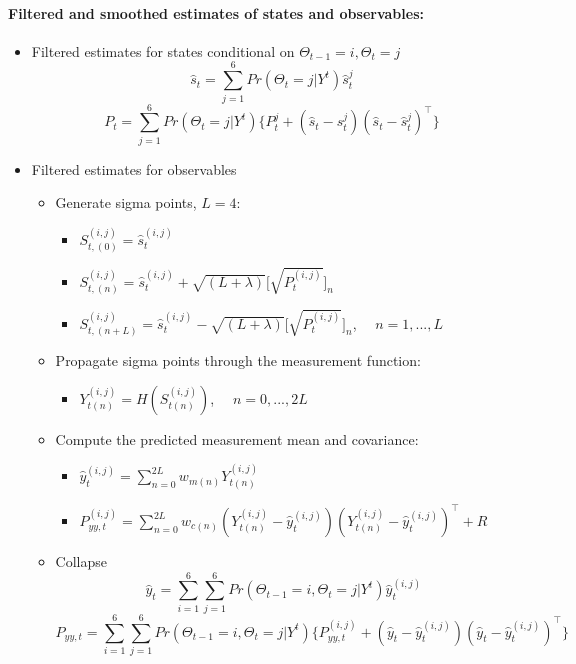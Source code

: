 \documentclass[12pt,letter,leqno]{article}
\theoremstyle{asn}
\theoremstyle{lem}
\theoremstyle{slem}
\theoremstyle{prop}
\theoremstyle{appprop}
\theoremstyle{rem}
\theoremstyle{defn}
\begin{document}
\paragraph{Filtered and smoothed estimates of states and observables:}
\begin{itemize}
\item Filtered estimates for states conditional on $\Theta_{t-1}=i,\Theta_{t}=j$
\begin{equation*}
\hat{s}_t=\sum_{j=1}^6 Pr(\Theta_t=j|Y^t)\hat{s}_t^{j}
\end{equation*}
\begin{equation*}
P_t=\sum_{j=1}^6 Pr(\Theta_t=j|Y^t)\{P_t^{j}+(\hat{s}_t-\hat{s}_t^{j})(\hat{s}_t-\hat{s}_t^{j})^\top \}
\end{equation*}

\item Filtered estimates for observables
\begin{itemize}
\item Generate sigma points, $L=4$: 
\begin{itemize}
\item $S_{t,(0)}^{(i,j)}  =\hat{s}_t^{(i,j)}$
\item $S_{t,(n)}^{(i,j)}  =\hat{s}_t^{(i,j)} + \sqrt{(L+\lambda)}\big[\sqrt{P_t^{(i,j)}}\big]_n$
\item $S_{t,(n+L)}^{(i,j)}  =\hat{s}_t^{(i,j)} - \sqrt{(L+\lambda)}\big[\sqrt{P_t^{(i,j)}}\big]_n$, $\quad  n=1,...,L$
\end{itemize}

\item Propagate sigma points through the measurement function:
\begin{itemize}
\item $Y_{t(n)}^{(i,j)} = H(S_{t(n)}^{(i,j)})$, $\quad  n=0,...,2L$
\end{itemize}
\item Compute the predicted measurement mean and covariance:
\begin{itemize}
\item $\hat{y}_t^{(i,j)} = \sum_{n=0}^{2L} w_{m(n)} Y_{t(n)}^{(i,j)}$
\item $P_{yy,t}^{(i,j)} = \sum_{n=0}^{2L} w_{c(n)} (Y_{t(n)}^{(i,j)} - \hat{y}_t^{(i,j)})(Y_{t(n)}^{(i,j)} - \hat{y}_t^{(i,j)})^\top + R$
\end{itemize}

\item Collapse 
\begin{equation*}
\hat{y}_t=\sum_{i=1}^6\sum_{j=1}^6 Pr(\Theta_{t-1}=i,\Theta_t=j|Y^t)\hat{y}_t^{(i,j)}
\end{equation*}
\begin{equation*}
P_{yy,t}=\sum_{i=1}^6\sum_{j=1}^6 Pr(\Theta_{t-1}=i,\Theta_t=j|Y^t)\{P_{yy,t}^{(i,j)}+(\hat{y}_t-\hat{y}_t^{(i,j)})(\hat{y}_t-\hat{y}_t^{(i,j)})^\top \}
\end{equation*}
\end{itemize}


\end{itemize}
\end{document}
